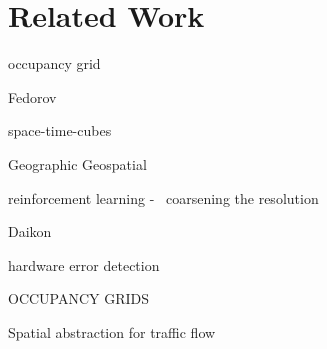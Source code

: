\section{Related Work}
\label{sec:related}


occupancy grid

Fedorov~\cite{fedorov1885elements}

space-time-cubes


Geographic Geospatial


reinforcement learning - ~coarsening the resolution 

Daikon
~\cite{kataoka2001automated}

hardware error detection
~\cite{sahoo2008using}

OCCUPANCY GRIDS
~\cite{moravec1985high}

Spatial abstraction for traffic flow
~\cite{shahar1998knowledge}






